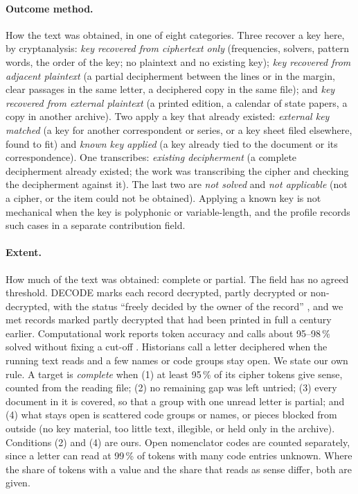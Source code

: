 \documentclass[11pt]{article}
\begin{document}
\paragraph{Outcome method.} How the text was obtained, in one of eight categories. Three recover a key here, by cryptanalysis: \emph{key recovered from ciphertext only} (frequencies, solvers, pattern words, the order of the key; no plaintext and no existing key); \emph{key recovered from adjacent plaintext} (a partial decipherment between the lines or in the margin, clear passages in the same letter, a deciphered copy in the same file); and \emph{key recovered from external plaintext} (a printed edition, a calendar of state papers, a copy in another archive). Two apply a key that already existed: \emph{external key matched} (a key for another correspondent or series, or a key sheet filed elsewhere, found to fit) and \emph{known key applied} (a key already tied to the document or its correspondence). One transcribes: \emph{existing decipherment} (a complete decipherment already existed; the work was transcribing the cipher and checking the decipherment against it). The last two are \emph{not solved} and \emph{not applicable} (not a cipher, or the item could not be obtained). Applying a known key is not mechanical when the key is polyphonic or variable-length, and the profile records such cases in a separate contribution field.

\paragraph{Extent.} How much of the text was obtained: complete or partial. The field has no agreed threshold. DECODE marks each record decrypted, partly decrypted or non-decrypted, with the status ``freely decided by the owner of the record'' \cite{Megyesi:2019}, and we met records marked partly decrypted that had been printed in full a century earlier. Computational work reports token accuracy and calls about 95--98\,\% solved without fixing a cut-off \cite{Ravi:2011}. Historians call a letter deciphered when the running text reads and a few names or code groups stay open. We state our own rule. A target is \emph{complete} when (1) at least 95\,\% of its cipher tokens give sense, counted from the reading file; (2) no remaining gap was left untried; (3) every document in it is covered, so that a group with one unread letter is partial; and (4) what stays open is scattered code groups or names, or pieces blocked from outside (no key material, too little text, illegible, or held only in the archive). Conditions (2) and (4) are ours. Open nomenclator codes are counted separately, since a letter can read at 99\,\% of tokens with many code entries unknown. Where the share of tokens with a value and the share that reads as sense differ, both are given.
\end{document}

